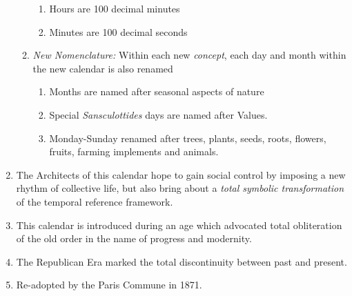 \documentclass[a4paper]{article}
\begin{document}
\begin{enumerate}
\begin{enumerate}[label=\alph*.]
\begin{enumerate}[label=\roman*.]
			\item Hours are 100 decimal minutes
			\item Minutes are 100 decimal seconds
		\end{enumerate}
		\item \textit{New Nomenclature:} Within each new \textit{concept}, each day and month within the new calendar is also renamed
		\begin{enumerate}[label=\roman*.]
			\item Months are named after seasonal aspects of nature
			\item Special \textit{Sansculottides} days are named after Values.
			\item Monday-Sunday renamed after trees, plants, seeds, roots, flowers, fruits, farming implements and animals.
		\end{enumerate}
	\end{enumerate}
	\item The Architects of this calendar hope to gain social control by imposing a new rhythm of collective life, but also bring about a \textit{total symbolic transformation} of the temporal reference framework.
	\item This calendar is introduced during an age which advocated total obliteration of the old order in the name of progress and modernity.
	\item The Republican Era marked the total discontinuity between past and present.
	\item Re-adopted by the Paris Commune in 1871.
\end{enumerate}

\medskip
\end{document}
